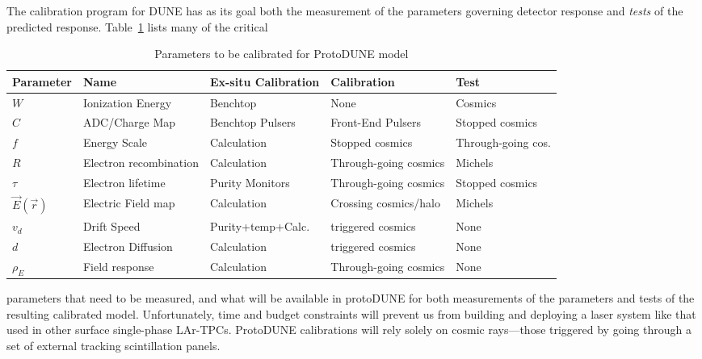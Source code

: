 	        The calibration program for DUNE has as its goal both the
measurement of the parameters governing detector response and {\it tests} of
the predicted response.  Table~\ref{tbl:params} lists many of the critical
%
\begin{table}
\begin{center}
\begin{tabular}{|l| l| l| l| l| } \hline \hline
{\bf Parameter} & {\bf Name} & {\bf Ex-situ Calibration} & {\bf Calibration} & {\bf Test} \\ \hline
$W$ & Ionization Energy  & Benchtop & None & Cosmics \\
$C$ & ADC/Charge Map & Benchtop Pulsers & Front-End Pulsers & Stopped cosmics \\
$f$ & Energy Scale & Calculation & Stopped cosmics & Through-going cos. \\
$R$ & Electron recombination & Calculation & Through-going cosmics & Michels\\
$\tau$ & Electron lifetime & Purity Monitors & Through-going cosmics & Stopped
cosmics\\
$\vec{E}(\vec{r})$ & Electric Field map & Calculation & Crossing cosmics/halo &
Michels \\
$v_d$ & Drift Speed & Purity+temp+Calc.& triggered cosmics & None \\
$d$ & Electron Diffusion & Calculation & triggered cosmics & None \\
$\rho_E$ & Field response & Calculation & Through-going cosmics & None \\ \hline \hline
\end{tabular}
\caption{Parameters to be calibrated for ProtoDUNE model\label{tbl:params}}
\end{center}
\end{table}
%
parameters that need to be measured, and what will be available in protoDUNE
for both measurements of the parameters and tests of the resulting calibrated
model.  Unfortunately, time and budget constraints will prevent us from
building and deploying a laser system like that used in other surface
single-phase LAr-TPCs.  ProtoDUNE calibrations will rely solely on cosmic rays---those triggered by
going through a set of external tracking scintillation panels.  


